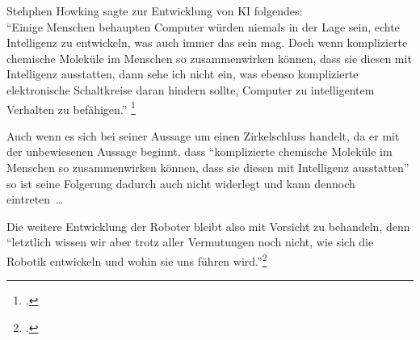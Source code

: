 Stehphen Howking sagte zur Entwicklung von \ac{KI} folgendes: \\
\enquote{Einige Menschen behaupten Computer würden niemals in der Lage sein,
echte Intelligenz zu entwickeln, was auch immer das sein mag. Doch
wenn komplizierte chemische Moleküle im Menschen so zusammenwirken
können, dass sie diesen mit Intelligenz ausstatten, dann sehe ich
nicht ein, was ebenso komplizierte elektronische Schaltkreise daran
hindern sollte, Computer zu intelligentem Verhalten zu befähigen.}
\footcite{Hawking:Zitat:KI}

Auch wenn es sich bei seiner Aussage um einen Zirkelschluss handelt,
da er mit der unbewiesenen Aussage beginnt, dass
\enquote{komplizierte chemische Moleküle im Menschen so
zusammenwirken können, dass sie diesen mit Intelligenz ausstatten}
so ist seine Folgerung dadurch auch nicht widerlegt und kann
dennoch eintreten~\dots




\bigskip
Die weitere Entwicklung der Roboter bleibt also mit Vorsicht zu behandeln,
denn \enquote{letztlich wissen wir aber trotz aller Vermutungen noch nicht,
wie sich die Robotik entwickeln und wohin sie uns führen wird.}\footcite[74]{sdw:2010-12:DfK}
\label{sec:drohnen:end}
